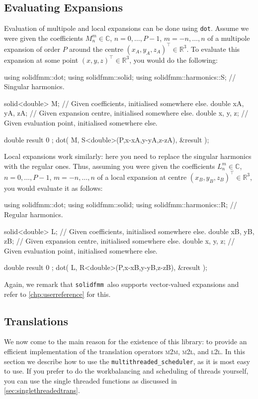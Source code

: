 \documentclass{scrbook}
\newcommand{\solidfmm}{\texttt{solidfmm}}
\newcommand{\MtoM}{\textsc{m2m}}
\newcommand{\MtoL}{\textsc{m2l}}
\newcommand{\LtoL}{\textsc{l2l}}
\newcommand{\reals}{\ensuremath{\mathbb{R}}}
\newcommand{\complex}{\mathbb{C}}
\newcommand{\wholespace}{\ensuremath{\reals^3}}
\begin{document}
\subsection{Evaluating Expansions}
Evaluation of multipole and local expansions can be done using \lstinline|dot|.
Assume we were given the coefficients $M_n^m\in\complex$, $n=0,\dotsc,P-1$,
$m=-n,\dotsc,n$ of a multipole expansion of order $P$ around the centre
$(x_A,y_A,z_A)^\top\in\wholespace$. To evaluate this expansion at some
point $(x,y,z)^\top\in\wholespace$, you would do the following:
\begin{cppcode*}
using solidfmm::dot;
using solidfmm::solid;
using solidfmm::harmonics::S; // Singular harmonics.

solid<double> M;    // Given coefficients,     initialised somewhere else.
double xA, yA, zA;  // Given expansion centre, initialised somewhere else.
double x,  y,  z;   // Given evaluation point, initialised somewhere else.

double result { 0 };
dot( M, S<double>(P,x-xA,y-yA,z-zA), &result );
\end{cppcode*}

Local expansions work similarly: here you need to replace the singular
harmonics with the regular ones. Thus, assuming you were given the
coefficients $L_n^m\in\complex$, $n=0,\dotsc,P-1$, $m=-n,\dotsc,n$ of a
local expansion at centre $(x_B,y_B,z_B)^\top\in\wholespace$, you would
evaluate it as follows:
\begin{cppcode*}
using solidfmm::dot;
using solidfmm::solid;
using solidfmm::harmonics::R; // Regular harmonics.

solid<double> L;    // Given coefficients,     initialised somewhere else.
double xB, yB, zB;  // Given expansion centre, initialised somewhere else.
double x,  y,  z;   // Given evaluation point, initialised somewhere else.

double result { 0 };
dot( L, R<double>(P,x-xB,y-yB,z-zB), &result );
\end{cppcode*}

Again, we remark that \solidfmm\ also supports vector-valued expansions and
refer to \cref{chp:userreference} for this.

\subsection{Translations}\label{sec:quicktranslations}
We now come to the main reason for the existence of this library: to provide an
efficient implementation of the translation operators \MtoM, \MtoL, and
\LtoL. In this section we describe how to use the
\lstinline|multithreaded_scheduler|, as it is most easy to use. If you prefer
to do the workbalancing and scheduling of threads yourself, you can use
the single threaded functions as discussed in \cref{sec:singlethreadedtrans}.
\end{document}
